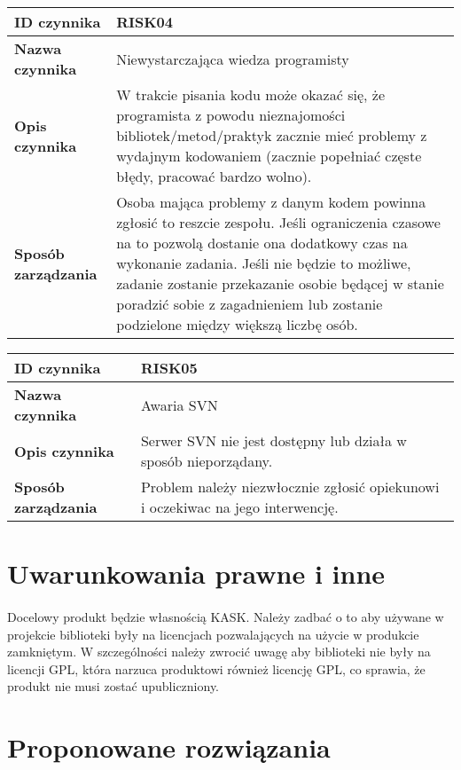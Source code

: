 \documentclass[a4paper,10pt]{article}
\begin{document}
\begin{center}
\begin{tabular}{|l|p{12cm}|}
\hline
\textbf{ID czynnika} &  RISK04 \tabularnewline \hline
\textbf{Nazwa czynnika} & Niewystarczająca wiedza programisty \tabularnewline \hline
\textbf{Opis czynnika} & W trakcie pisania kodu może okazać się, że programista z powodu nieznajomości bibliotek/metod/praktyk zacznie mieć problemy z wydajnym kodowaniem (zacznie popełniać częste błędy, pracować bardzo wolno).  \tabularnewline \hline
\textbf{Sposób zarządzania} & Osoba mająca problemy z danym kodem powinna zgłosić to reszcie zespołu. Jeśli ograniczenia czasowe na to pozwolą dostanie ona dodatkowy czas na wykonanie zadania. Jeśli nie będzie to możliwe, zadanie zostanie przekazanie osobie będącej w stanie poradzić sobie z zagadnieniem lub zostanie podzielone między większą liczbę osób. \tabularnewline \hline
\end{tabular}
\end{center}

\begin{center}
\begin{tabular}{|l|p{12cm}|}
\hline
\textbf{ID czynnika} &  RISK05 \tabularnewline \hline
\textbf{Nazwa czynnika} & Awaria SVN \tabularnewline \hline
\textbf{Opis czynnika} & Serwer SVN nie jest dostępny lub działa w sposób nieporządany. \tabularnewline \hline
\textbf{Sposób zarządzania} & Problem należy niezwłocznie zgłosić opiekunowi i oczekiwac na jego interwencję. \tabularnewline \hline
\end{tabular}
\end{center}



\section{Uwarunkowania prawne i inne}
\paragraph{} Docelowy produkt będzie własnością KASK.  Należy zadbać  o to aby używane w projekcie biblioteki były na licencjach pozwalających na użycie w produkcie zamkniętym. W szczególności należy zwrocić uwagę aby biblioteki nie były na licencji GPL, która narzuca produktowi również licencję GPL, co sprawia, że produkt nie musi zostać upubliczniony.   


\section{Proponowane rozwiązania}
\end{document}
